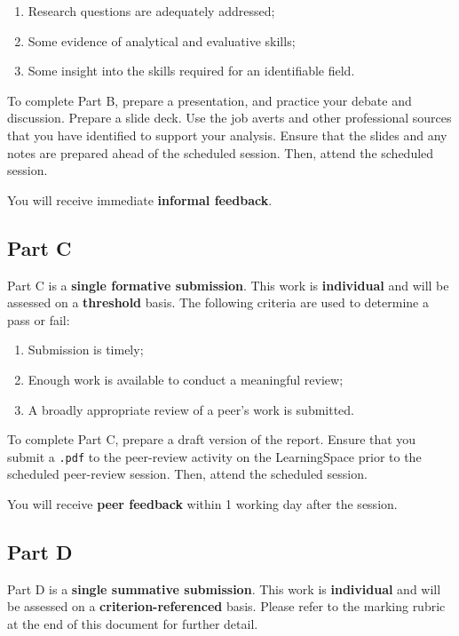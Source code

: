 \documentclass{../../fal_assignment}
\begin{document}
\begin{enumerate}[label=(\alph*)]
	\item Research questions are adequately addressed;
	\item Some evidence of analytical and evaluative skills;
	\item Some insight into the skills required for an identifiable field.
\end{enumerate}

To complete Part B, prepare a presentation, and practice your debate and discussion. Prepare a slide deck. Use the job averts and other professional sources that you have identified to support your analysis. Ensure that the slides and any notes are prepared ahead of the scheduled session. Then, attend the scheduled session.

You will receive immediate \textbf{informal feedback}.

\subsection*{Part C}

Part C is a \textbf{single formative submission}. This work is \textbf{individual} and will be assessed on a \textbf{threshold} basis. The following criteria are used to determine a pass or fail:

\begin{enumerate}[label=(\alph*)]
	\item Submission is timely;
	\item Enough work is available to conduct a meaningful review;
	\item A broadly appropriate review of a peer's work is submitted.
\end{enumerate}

To complete Part C, prepare a draft version of the report. Ensure that you submit a \texttt{.pdf} to the peer-review activity on the LearningSpace prior to the scheduled peer-review session. Then, attend the scheduled session.

You will receive \textbf{peer feedback} within 1 working day after the session.

\subsection*{Part D}

Part D is a \textbf{single summative submission}. This work is \textbf{individual} and will be assessed on a \textbf{criterion-referenced} basis. Please refer to the marking rubric at the end of this document for further detail.
\end{document}
